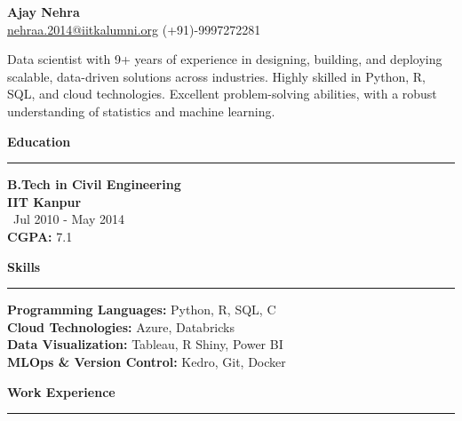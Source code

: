 \documentclass[a4paper,10pt]{article}
\begin{document}
\begin{center}
    \textbf{\LARGE Ajay Nehra} \\
    \vspace{1mm}
    \href{mailto:nehraa.2014@iitkalumni.org}{nehraa.2014@iitkalumni.org} \hspace{5mm} (+91)-9997272281
\end{center}

\vspace{4mm}

Data scientist with 9+ years of experience in designing, building, and deploying scalable, data-driven solutions across industries. Highly skilled in Python, R, SQL, and cloud technologies. Excellent problem-solving abilities, with a robust understanding of statistics and machine learning.

\vspace{4mm}

\begin{multicols}{2}

\textbf{\LARGE Education} \\
\vspace{1mm}
\rule{\textwidth}{0.4pt}
\textbf{B.Tech in Civil Engineering} \\
\textbf{IIT Kanpur} \\
\faCalendar \, Jul 2010 - May 2014 \\
\textbf{CGPA:} 7.1

\columnbreak

\textbf{\LARGE Skills} \\
\vspace{1mm}
\rule{\textwidth}{0.4pt}
\textbf{Programming Languages:} Python, R, SQL, C \\
\textbf{Cloud Technologies:} Azure, Databricks \\
\textbf{Data Visualization:} Tableau, R Shiny, Power BI \\
\textbf{MLOps \& Version Control:} Kedro, Git, Docker

\end{multicols}

\vspace{4mm}

\textbf{\LARGE Work Experience} \\
\vspace{1mm}
\rule{\textwidth}{0.4pt}
\end{document}
